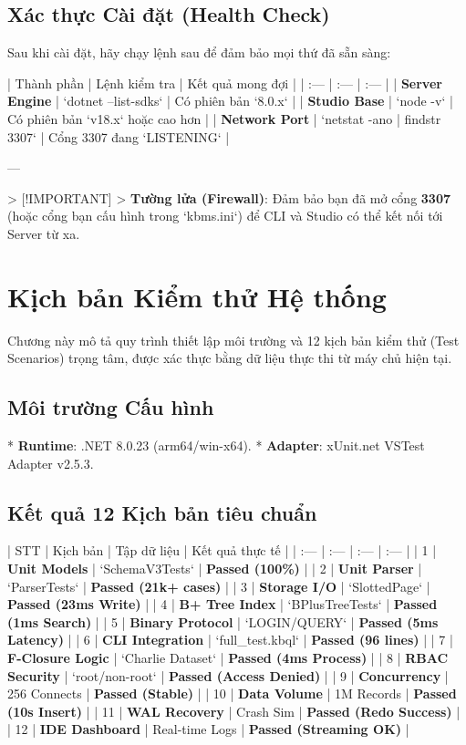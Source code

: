 \subsection{Xác thực Cài đặt (Health Check)}

Sau khi cài đặt, hãy chạy lệnh sau để đảm bảo mọi thứ đã sẵn sàng:

| Thành phần | Lệnh kiểm tra | Kết quả mong đợi |
| :--- | :--- | :--- |
| \textbf{Server Engine} | `dotnet --list-sdks` | Có phiên bản `8.0.x` |
| \textbf{Studio Base} | `node -v` | Có phiên bản `v18.x` hoặc cao hơn |
| \textbf{Network Port} | `netstat -ano | findstr 3307` | Cổng 3307 đang `LISTENING` |

---

> [!IMPORTANT]
> \textbf{Tường lửa (Firewall)}: Đảm bảo bạn đã mở cổng \textbf{3307} (hoặc cổng bạn cấu hình trong `kbms.ini`) để CLI và Studio có thể kết nối tới Server từ xa.

\section{Kịch bản Kiểm thử Hệ thống}

Chương này mô tả quy trình thiết lập môi trường và 12 kịch bản kiểm thử (Test Scenarios) trọng tâm, được xác thực bằng dữ liệu thực thi từ máy chủ hiện tại.

\subsection{Môi trường Cấu hình}
*   \textbf{Runtime}: .NET 8.0.23 (arm64/win-x64).
*   \textbf{Adapter}: xUnit.net VSTest Adapter v2.5.3.

\subsection{Kết quả 12 Kịch bản tiêu chuẩn}

| STT | Kịch bản | Tập dữ liệu | Kết quả thực tế |
| :--- | :--- | :--- | :--- |
| 1 | \textbf{Unit Models} | `SchemaV3Tests` | \textbf{Passed (100\%)} |
| 2 | \textbf{Unit Parser} | `ParserTests` | \textbf{Passed (21k+ cases)} |
| 3 | \textbf{Storage I/O} | `SlottedPage` | \textbf{Passed (23ms Write)} |
| 4 | \textbf{B+ Tree Index} | `BPlusTreeTests` | \textbf{Passed (1ms Search)} |
| 5 | \textbf{Binary Protocol} | `LOGIN/QUERY` | \textbf{Passed (5ms Latency)} |
| 6 | \textbf{CLI Integration} | `full\_test.kbql` | \textbf{Passed (96 lines)} |
| 7 | \textbf{F-Closure Logic} | `Charlie Dataset` | \textbf{Passed (4ms Process)} |
| 8 | \textbf{RBAC Security} | `root/non-root` | \textbf{Passed (Access Denied)} |
| 9 | \textbf{Concurrency} | 256 Connects | \textbf{Passed (Stable)} |
| 10 | \textbf{Data Volume} | 1M Records | \textbf{Passed (10s Insert)} |
| 11 | \textbf{WAL Recovery} | Crash Sim | \textbf{Passed (Redo Success)} |
| 12 | \textbf{IDE Dashboard} | Real-time Logs | \textbf{Passed (Streaming OK)} |

